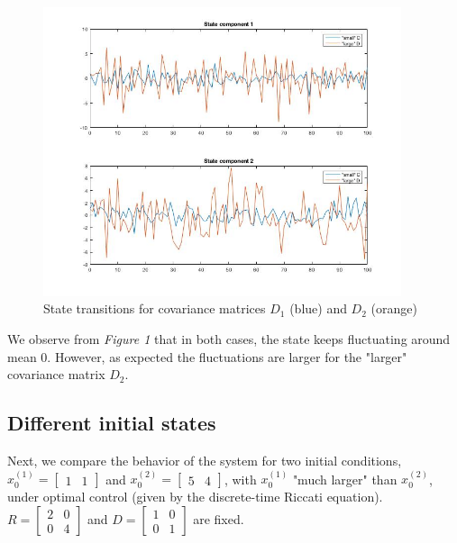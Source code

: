 \documentclass[11pt, oneside]{article}   	%
\begin{document}
\begin{figure}[ht!]
\centering
\includegraphics[width=105mm]{../plots/ii.jpg}
\caption{State transitions for covariance matrices $D_1$ (blue) and $D_2$ (orange)}
\end{figure}   

We observe from \textit{Figure 1} that in both cases, the state keeps fluctuating around mean 0. However, as expected the fluctuations are larger for the "larger" covariance matrix $D_2$.

\subsection{Different initial states}
Next, we compare the behavior of the system for two initial conditions, $x_0^{(1)} = \begin{bmatrix} 1 & 1 \end{bmatrix}$ and $x_0^{(2)} = \begin{bmatrix} 5 & 4 \end{bmatrix}$, with $x_0^{(1)}$ "much larger" than $x_0^{(2)}$, under optimal control (given by the discrete-time Riccati equation). $R = \begin{bmatrix} 2 & 0 \\[0.3em] 0 & 4 \end{bmatrix}$ and $D = \begin{bmatrix} 1 & 0 \\[0.3em] 0 & 1 \end{bmatrix}$ are fixed. \\
\end{document}
